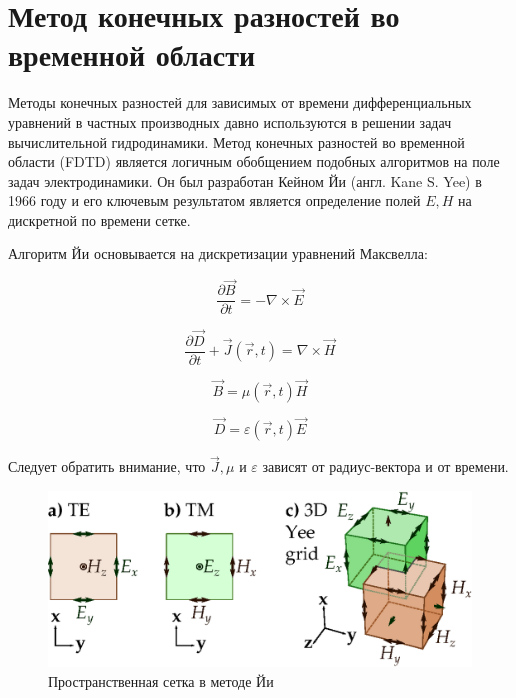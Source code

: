 \section{Метод конечных разностей во временной области}

Методы конечных разностей для зависимых от времени дифференциальных уравнений в частных производных давно используются в решении задач вычислительной гидродинамики. Метод конечных разностей во временной области (FDTD) является логичным обобщением подобных алгоритмов на поле задач электродинамики. Он был разработан \cite{Yee1966} Кейном Йи (англ. Kane S. Yee) в 1966 году и его ключевым результатом является определение полей $E, H$ на дискретной по времени сетке.

Алгоритм Йи основывается на дискретизации уравнений Максвелла:

\begin{equation}
  \frac{\partial \vec{B}}{\partial t} = - \nabla \times \vec{E}
  \label{eq:maxwell_B}
\end{equation}

\begin{equation}
  \frac{\partial \vec{D}}{\partial t} + \vec{J}(\vec{r}, t) = \nabla \times \vec{H}
  \label{eq:maxwell_D}
\end{equation}

\begin{equation}
  \vec{B} = \mu(\vec{r}, t)\vec{H}
\end{equation}

\begin{equation}
  \vec{D} = \varepsilon(\vec{r}, t)\vec{E}
\end{equation}

Следует обратить внимание, что $\vec{J}, \mu$ и $\varepsilon$ зависят от радиус-вектора и от времени.

\begin{figure}[h]
	\centering
	\includegraphics{img/FDTD_Yee_grid_2d_3d}
	\caption{Пространственная сетка в методе Йи}
	\label{fig:fdtd}
\end{figure}

